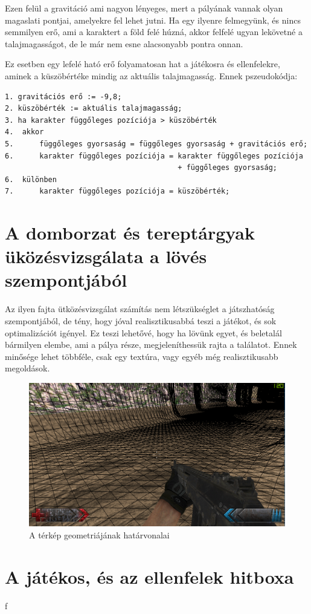 Ezen felül a gravitáció ami nagyon lényeges, mert a pályának vannak olyan magaslati pontjai, amelyekre fel lehet jutni. Ha egy ilyenre felmegyünk, és nincs semmilyen erő, ami a karaktert a föld felé húzná, akkor felfelé ugyan lekövetné a talajmagasságot, de le már nem esne alacsonyabb pontra onnan.

 Ez esetben egy lefelé ható erő folyamatosan hat a játékosra és ellenfelekre, aminek a küszöbértéke mindig az aktuális talajmagasság. Ennek pszeudokódja:

\begin{verbatim}
1. gravitációs erő := -9,8;
2. küszöbérték := aktuális talajmagasság;
3. ha karakter függőleges pozíciója > küszöbérték
4. 	akkor
5.		függőleges gyorsaság = függőleges gyorsaság + gravitációs erő;
6.		karakter függőleges pozíciója = karakter függőleges pozíciója 
										+ függőleges gyorsaság;
6.	különben
7. 		karakter függőleges pozíciója = küszöbérték;
\end{verbatim}
 
\section{A domborzat és tereptárgyak üközésvizsgálata a lövés szempontjából}

Az ilyen fajta ütközésvizsgálat számítás nem létszükséglet a játszhatóság szempontjából, de tény, hogy jóval realisztikusabbá teszi a játékot, és sok optimalizációt igényel. Ez teszi lehetővé, hogy ha lövünk egyet, és beletalál bármilyen elembe, ami a pálya része, megjeleníthessük rajta a találatot. Ennek minősége lehet többféle, csak egy textúra, vagy egyéb még realisztikusabb megoldások.

\begin{figure}[h]
\centering
\includegraphics[scale=0.4]{kepek/map_wireframe.png}
\caption{A térkép geometriájának határvonalai}
\label{fig:wireframe}
\end{figure}



\section{A játékos, és az ellenfelek hitboxa}

f


